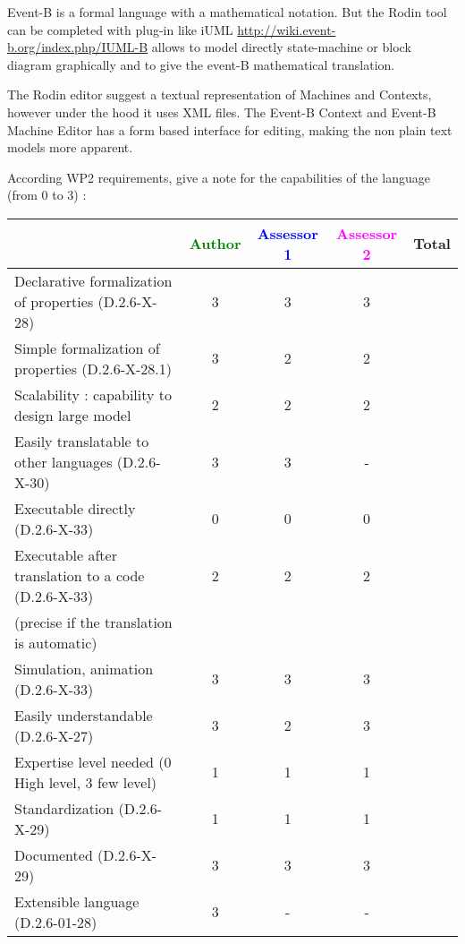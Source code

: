 \begin{author_comment}
Event-B  is a formal language with a mathematical notation. But the Rodin tool can be completed with plug-in like iUML \url{http://wiki.event-b.org/index.php/IUML-B} allows to model directly state-machine or block diagram  graphically and to  give the event-B mathematical translation.
\end{author_comment}

\begin{assessor2}
  The Rodin editor suggest a textual representation of Machines and
  Contexts, however under the hood it uses XML files. The Event-B
  Context and Event-B Machine Editor has a form based interface for
  editing, making the non plain text models more apparent.
\end{assessor2}

According WP2 requirements, give a note for the capabilities of the language (from 0 to 3) :

\begin{tabular}{|l | c | c | c | c|}
\hline
& \textcolor{green}{Author} & \textcolor{blue}{Assessor 1} & \textcolor{magenta}{Assessor 2} & Total \\
\hline
Declarative formalization of properties (D.2.6-X-28) & 3 & 3 & 3 & \\
\hline
Simple formalization of properties (D.2.6-X-28.1) & 3 & 2 & 2 & \\
\hline
Scalability : capability to design large model & 2 & 2 & 2 & \\
\hline
Easily translatable to other languages (D.2.6-X-30) & 3 & 3 & - & \\
\hline
Executable directly (D.2.6-X-33) & 0 & 0 & 0 & \\
\hline
Executable after translation to a code (D.2.6-X-33) & 2 & 2 & 2 & \\
(precise if the translation is automatic) & & & & \\
\hline
Simulation, animation (D.2.6-X-33) & 3 & 3 & 3 & \\
\hline
Easily understandable (D.2.6-X-27) & 3 & 2 & 3 & \\
\hline
Expertise level needed (0 High level, 3 few level) & 1 & 1 & 1 & \\
\hline
Standardization (D.2.6-X-29) & 1 & 1 & 1 & \\
\hline
Documented (D.2.6-X-29) & 3 & 3 & 3 & \\
\hline
Extensible language (D.2.6-01-28) & 3 & - & - & \\
\hline
\end{tabular}


